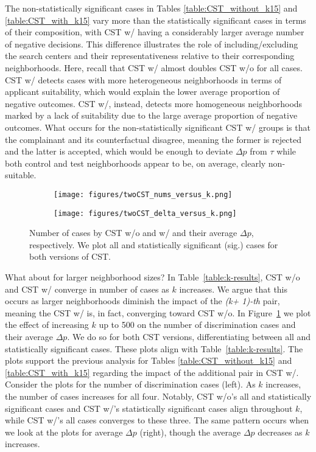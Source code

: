 The non-statistically significant cases in Tables \ref{table:CST_without_k15} and \ref{table:CST_with_k15} vary more than the statistically significant cases in terms of their composition, with CST w/ having a considerably larger average number of negative decisions.
This difference illustrates the role of including/excluding the search centers and their representativeness relative to their corresponding neighborhoods.
Here, recall that CST w/ almost doubles CST w/o for all cases. 
CST w/ detects cases with more heterogeneous neighborhoods in terms of applicant suitability, which would explain the lower average proportion of negative outcomes.
CST w/, instead, detects more homogeneous neighborhoods marked by a lack of suitability due to the large average proportion of negative outcomes. What occurs for the non-statistically significant CST w/ groups is that the complainant and its counterfactual disagree, meaning the former is rejected and the latter is accepted, which would be enough to deviate $\Delta p$ from $\tau$ while both control and test neighborhoods appear to be, on average, clearly non-suitable. 

%
\begin{figure}[t]
    \centering
    \begin{subfigure}{.45\linewidth}
    \texttt{[image: figures/twoCST\_nums\_versus\_k.png]}
    \end{subfigure}
    \hfill
    \begin{subfigure}{.45\linewidth}
    \texttt{[image: figures/twoCST\_delta\_versus\_k.png]}
    \end{subfigure}
\caption{Number of cases by CST w/o and w/ and their average $\Delta p$, respectively. We plot all and statistically significant (sig.) cases for both versions of CST.}
\label{fig:TwoCSTs_k_param}
\end{figure}
%

What about for larger neighborhood sizes? 
In Table~\ref{table:k-results}, CST w/o and CST w/ converge in number of cases as $k$ increases.
We argue that this occurs as larger neighborhoods diminish the impact of the \textit{(k+ 1)-th} pair, meaning the CST w/ is, in fact, converging toward CST w/o.
In Figure~\ref{fig:TwoCSTs_k_param} we plot the effect of increasing $k$ up to 500 on the number of discrimination cases and their average $\Delta p$. 
We do so for both CST versions, differentiating between all and statistically significant cases.
These plots align with Table~\ref{table:k-results}.
The plots support the previous analysis for Tables \ref{table:CST_without_k15} and \ref{table:CST_with_k15} regarding the impact of the additional pair in CST w/.
Consider the plots for the number of discrimination cases (left). As $k$ increases, the number of cases increases for all four. Notably, CST w/o's all and statistically significant cases and CST w/'s statistically significant cases align throughout $k$, while CST w/'s all cases converges to these three.
The same pattern occurs when we look at the plots for average $\Delta p$ (right), though the average $\Delta p$ decreases as $k$ increases.

